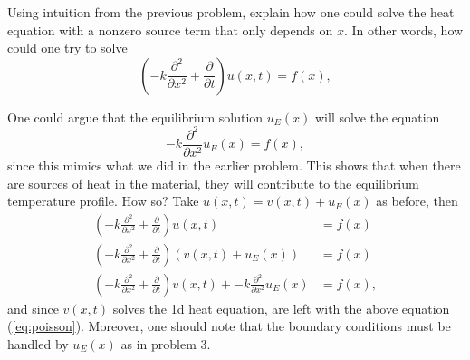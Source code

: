 \documentclass[12pt]{article} %
\begin{document}
\newpage
\begin{problem}
    Using intuition from the previous problem, explain how one could solve the heat equation with a nonzero source term that only depends on $x$. In other words, how could one try to solve
    \begin{equation}
    \label{eq:poisson}
    \left( -k \frac{\partial^2}{\partial x^2} + \frac{\partial}{\partial t} \right) u(x,t) = f(x),
    \end{equation}
\end{problem}
\begin{solution}
One could argue that the equilibrium solution $u_E(x)$ will solve the equation
\[
-k\frac{\partial^2}{\partial x^2} u_E(x) = f(x),
\]
since this mimics what we did in the earlier problem.  This shows that when there are sources of heat in the material, they will contribute to the equilibrium temperature profile. How so? Take $u(x,t)=v(x,t)+u_E(x)$ as before, then
\begin{align*}
\left( -k \frac{\partial^2}{\partial x^2} + \frac{\partial}{\partial t} \right) u(x,t) &= f(x)\\
\left( -k \frac{\partial^2}{\partial x^2} + \frac{\partial}{\partial t} \right)( v(x,t)+u_E(x)) &= f(x)\\
\left( -k \frac{\partial^2}{\partial x^2} + \frac{\partial}{\partial t} \right) v(x,t) + -k \frac{\partial^2}{\partial x^2} u_E(x) &= f(x),
\end{align*}
and since $v(x,t)$ solves the 1d heat equation, are left with the above equation (\cref{eq:poisson}). Moreover, one should note that the boundary conditions must be handled by $u_E(x)$ as in problem 3.
\end{solution}

\newpage
\end{document}
